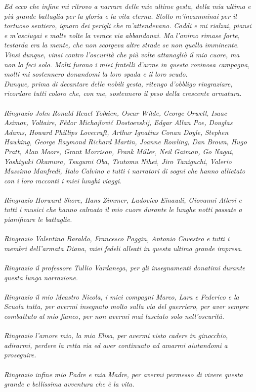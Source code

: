\textit{Ed ecco che infine mi ritrovo a narrare delle mie ultime gesta, della mia ultima e più grande battaglia per la gloria e la vita eterna. Stolto m'incamminai per il tortuoso sentiero, ignaro dei perigli che m'attendevano. Caddi e mi rialzai, piansi e m'asciugai e molte volte la verace via abbandonai. Ma l'animo rimase forte, testarda era la mente, che non scorgeva altre strade se non quella imminente. Vinsi dunque, vinsi contro l'oscurità che più volte attanagliò il mio cuore, ma non lo feci solo. Molti furono i miei fratelli d'arme in questa rovinosa campagna, molti mi sostennero donandomi la loro spada e il loro scudo. \\ 
Dunque, prima di decantare delle nobili gesta, ritengo d'obbligo ringraziare, ricordare tutti coloro che, con me, sostennero il peso della crescente armatura. \\ \\
Ringrazio John Ronald Reuel Tolkien, Oscar Wilde, George Orwell, Isaac Asimov, Voltaire, Fëdor Michajlovič Dostoevskij, Edgar Allan Poe, Douglas Adams, Howard Phillips Lovecraft, Arthur Ignatius Conan Doyle, Stephen Hawking, George Raymond Richard Martin, Joanne Rowling, Dan Brown, Hugo Pratt, Alan Moore, Grant Morrison, Frank Miller, Neil Gaiman, Go Nagai, Yoshiyuki Okamura, Tsugumi Oba, Tsutomu Nihei, Jiro Taniguchi, Valerio Massimo Manfredi, Italo Calvino e tutti i narratori di sogni che hanno allietato con i loro racconti i miei lunghi viaggi. \\ \\
Ringrazio Horward Shore, Hans Zimmer, Ludovico Einaudi, Giovanni Allevi e tutti i musici che hanno calmato il mio cuore durante le lunghe notti passate a pianificare le battaglie. \\ \\
Ringrazio Valentino Baraldo, Francesco Paggin, Antonio Cavestro e tutti i membri dell'armata Diana, miei fedeli alleati in questa ultima grande impresa. \\ \\
Ringrazio il professore Tullio Vardanega, per gli insegnamenti donatimi durante questa lunga narrazione. \\ \\
Ringrazio il mio Meastro Nicola, i miei compagni Marco, Lara e Federico e la Scuola tutta, per avermi insegnato molto sulla via del guerriero, per aver sempre combattuto al mio fianco, per non avermi mai lasciato solo nell'oscurità. \\ \\
Ringrazio l'amore mio, la mia Elisa, per avermi visto cadere in ginocchio, adirarmi, perdere la retta via ed aver continuato ad amarmi aiutandomi a proseguire. \\ \\ 
Ringrazio infine mio Padre e mia Madre, per avermi permesso di vivere questa grande e bellissima avventura che è la vita.}

\endgroup
